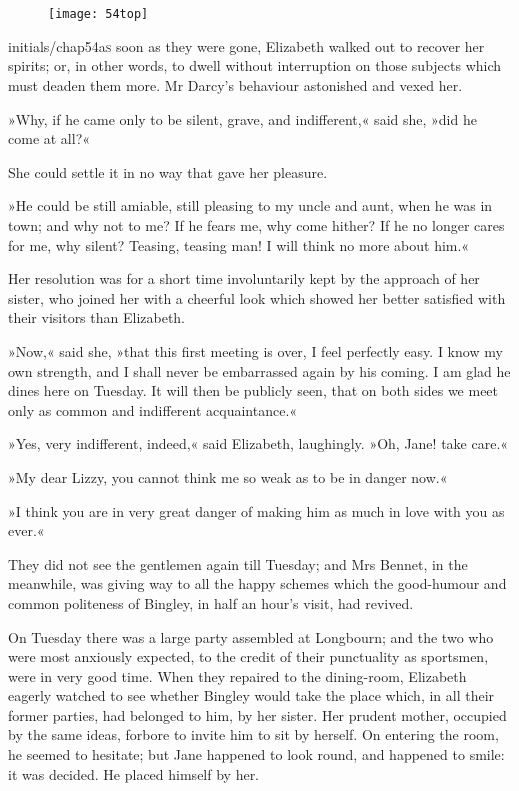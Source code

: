 \chapter[Chapter \thechapter]{}
	
	
\begin{figure}[t!]
\centering
\texttt{[image: 54top]}
\end{figure}


\lettrine[lines=6,image=true]{initials/chap54a}{s}  soon as they were gone, Elizabeth walked out to recover her spirits; or, in other words, to dwell without interruption on those subjects which must deaden them more. Mr Darcy's behaviour astonished and vexed her.

\zz
»Why, if he came only to be silent, grave, and indifferent,« said she, »did he come at all?«

She could settle it in no way that gave her pleasure.

»He could be still amiable, still pleasing to my uncle and aunt, when he was in town; and why not to me? If he fears me, why come hither? If he no longer cares for me, why silent? Teasing, teasing man! I will think no more about him.«

Her resolution was for a short time involuntarily kept by the approach of her sister, who joined her with a cheerful look which showed her better satisfied with their visitors than Elizabeth.

»Now,« said she, »that this first meeting is over, I feel perfectly easy. I know my own strength, and I shall never be embarrassed again by his coming. I am glad he dines here on Tuesday. It will then be publicly seen, that on both sides we meet only as common and indifferent acquaintance.«

»Yes, very indifferent, indeed,« said Elizabeth, laughingly. »Oh, Jane! take care.«

»My dear Lizzy, you cannot think me so weak as to be in danger now.«

»I think you are in very great danger of making him as much in love with you as ever.«

They did not see the gentlemen again till Tuesday; and Mrs Bennet, in the meanwhile, was giving way to all the happy schemes which the good-humour and common politeness of Bingley, in half an hour's visit, had revived.

On Tuesday there was a large party assembled at Longbourn; and the two who were most anxiously expected, to the credit of their punctuality as sportsmen, were in very good time. When they repaired to the dining-room, Elizabeth eagerly watched to see whether Bingley would take the place which, in all their former parties, had belonged to him, by her sister. Her prudent mother, occupied by the same ideas, forbore to invite him to sit by herself. On entering the room, he seemed to hesitate; but Jane happened to look round, and happened to smile: it was decided. He placed himself by her.

